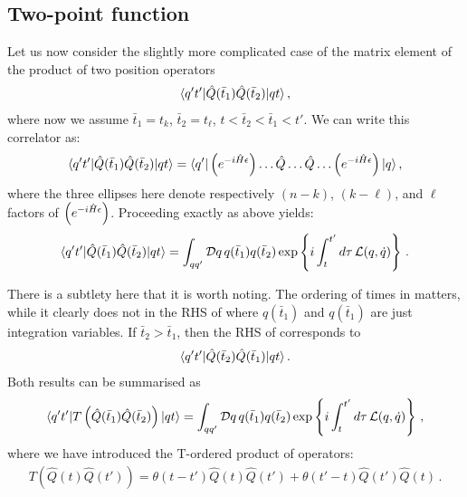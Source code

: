 \subsection{Two-point function}
\label{sec:two-point-function}

Let us now consider the slightly more complicated case of the matrix
element of the product of two position operators
\begin{align}
  \label{eq:TwoPtDef}
  \langle q't' | \hat{Q}(\bar{t}_1) \hat{Q}(\bar{t}_2)| qt \rangle\, , 
\end{align}
where now we assume $\bar{t}_1=t_k$, $\bar{t}_2=t_\ell$,
$t<\bar{t}_2<\bar{t}_1<t'$. We can write this correlator as:
\begin{align}
    \langle q't' | \hat{Q}(\bar{t}_1) \hat{Q}(\bar{t}_2)| qt \rangle = 
  \langle q' | \left(e^{-i \hat{H} \epsilon}\right) \dots \hat{Q} \ldots \hat{Q} \ldots \left(e^{-i \hat{H} \epsilon}\right)
  | q \rangle\, ,
\end{align}
where the three ellipses here denote respectively $(n-k)$, $(k-\ell)$,
and $\ell$ factors of $\left(e^{-i \hat{H} \epsilon}\right)$. Proceeding exactly as above yields: 
\begin{align}
  \label{eq:TwoPtPathInt}
  \langle q't' | \hat{Q}(\bar{t}_1) \hat{Q}(\bar{t}_2)| qt \rangle = 
  \int_{qq'} \mathcal{D}q\, q(\bar{t}_1) q(\bar{t}_2) 
  \exp \left\{
  i \int_t^{t'} d\tau\, \mathcal{L}(q,\dot{q})
  \right\}\, .
\end{align}

There is a subtlety here that it is worth noting. The ordering of
times in  matters, while it clearly does not in the
RHS of  where $q(\bar{t}_1)$ and $q(\bar{t}_1)$
are just integration variables. If $\bar{t}_2>\bar{t}_1$, then the RHS
of  corresponds to
\begin{align}
  \langle q't' | \hat{Q}(\bar{t}_2) \hat{Q}(\bar{t}_1) | qt \rangle\, .
\end{align}
Both results can be summarised as
\begin{align}
  \label{eq:TOrderPathInt}
  \langle q't' | T\left(\hat{Q}(\bar{t}_1) \hat{Q}(\bar{t}_2)
  \right)| qt \rangle = 
  \int_{qq'} \mathcal{D}q\, q(\bar{t}_1) q(\bar{t}_2) 
  \exp \left\{
  i \int_t^{t'} d\tau\, \mathcal{L}(q,\dot{q})
  \right\}\, ,
\end{align}
where we have introduced the T-ordered product of operators: 
\begin{align}
  \label{eq:TOrderDef}
   T\left(\hat{Q}(t) \hat{Q}(t')\right) = \theta(t-t') \hat{Q}(t)
  \hat{Q}(t') + \theta(t'-t) \hat{Q}(t') \hat{Q}(t)\, .
\end{align}

